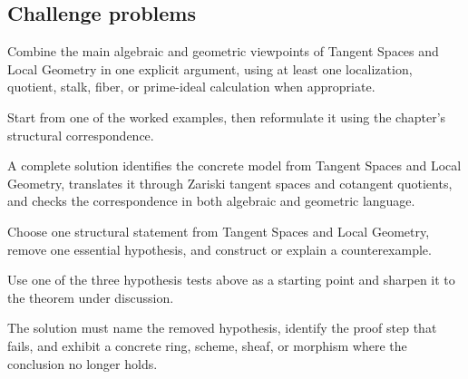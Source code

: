 \subsection*{Challenge problems}

\begin{exercise}\label{exr:vi32-expand-15}
Combine the main algebraic and geometric viewpoints of Tangent Spaces and Local Geometry in one explicit argument, using at least one localization, quotient, stalk, fiber, or prime-ideal calculation when appropriate.
\end{exercise}
\begin{hint}
Start from one of the worked examples, then reformulate it using the chapter's structural correspondence.
\end{hint}
\begin{solution}
A complete solution identifies the concrete model from Tangent Spaces and Local Geometry, translates it through Zariski tangent spaces and cotangent quotients, and checks the correspondence in both algebraic and geometric language.
\end{solution}

\begin{exercise}\label{exr:vi32-expand-16}
Choose one structural statement from Tangent Spaces and Local Geometry, remove one essential hypothesis, and construct or explain a counterexample.
\end{exercise}
\begin{hint}
Use one of the three hypothesis tests above as a starting point and sharpen it to the theorem under discussion.
\end{hint}
\begin{solution}
The solution must name the removed hypothesis, identify the proof step that fails, and exhibit a concrete ring, scheme, sheaf, or morphism where the conclusion no longer holds.
\end{solution}

